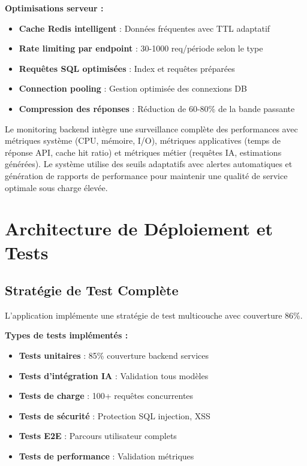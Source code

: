 \textbf{Optimisations serveur :}
\begin{itemize}
    \item \textbf{Cache Redis intelligent} : Données fréquentes avec TTL adaptatif
    \item \textbf{Rate limiting par endpoint} : 30-1000 req/période selon le type
    \item \textbf{Requêtes SQL optimisées} : Index et requêtes préparées
    \item \textbf{Connection pooling} : Gestion optimisée des connexions DB
    \item \textbf{Compression des réponses} : Réduction de 60-80\% de la bande passante
\end{itemize}

Le monitoring backend intègre une surveillance complète des performances avec métriques système (CPU, mémoire, I/O), métriques applicatives (temps de réponse API, cache hit ratio) et métriques métier (requêtes IA, estimations générées). Le système utilise des seuils adaptatifs avec alertes automatiques et génération de rapports de performance pour maintenir une qualité de service optimale sous charge élevée.

\section{Architecture de Déploiement et Tests}

\subsection{Stratégie de Test Complète}

L'application implémente une stratégie de test multicouche avec couverture 86\%.

\textbf{Types de tests implémentés :}
\begin{itemize}
    \item \textbf{Tests unitaires} : 85\% couverture backend services
    \item \textbf{Tests d'intégration IA} : Validation tous modèles
    \item \textbf{Tests de charge} : 100+ requêtes concurrentes
    \item \textbf{Tests de sécurité} : Protection SQL injection, XSS
    \item \textbf{Tests E2E} : Parcours utilisateur complets
    \item \textbf{Tests de performance} : Validation métriques
\end{itemize}

